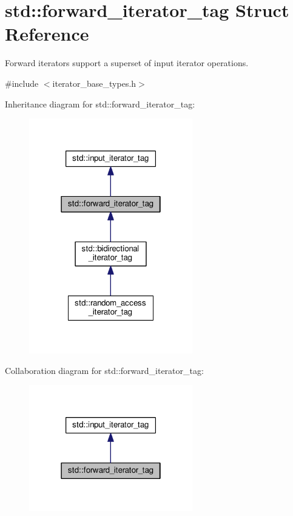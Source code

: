 \hypertarget{structstd_1_1forward__iterator__tag}{}\section{std\+:\+:forward\+\_\+iterator\+\_\+tag Struct Reference}
\label{structstd_1_1forward__iterator__tag}


Forward iterators support a superset of input iterator operations.  




{\ttfamily \#include $<$iterator\+\_\+base\+\_\+types.\+h$>$}



Inheritance diagram for std\+:\+:forward\+\_\+iterator\+\_\+tag\+:
\nopagebreak
\begin{figure}[H]
\begin{center}
\leavevmode
\includegraphics[width=202pt]{structstd_1_1forward__iterator__tag__inherit__graph}
\end{center}
\end{figure}


Collaboration diagram for std\+:\+:forward\+\_\+iterator\+\_\+tag\+:
\nopagebreak
\begin{figure}[H]
\begin{center}
\leavevmode
\includegraphics[width=202pt]{structstd_1_1forward__iterator__tag__coll__graph}
\end{center}
\end{figure}


